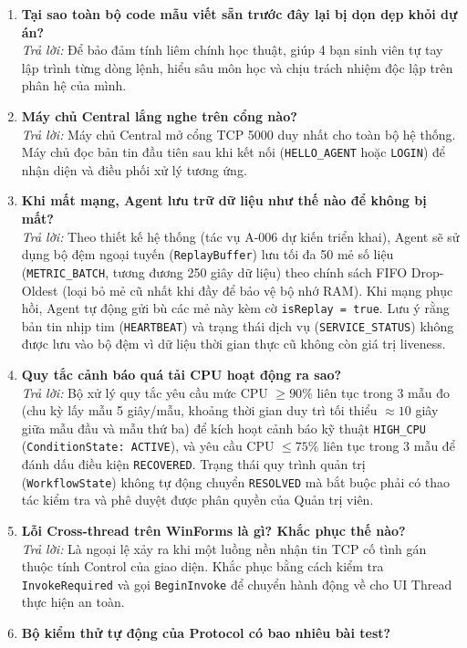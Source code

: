 \documentclass[12pt,a4paper]{article}
\begin{document}
\begin{enumerate}[leftmargin=*, label=\textbf{Câu \arabic*:}]
  \item \textbf{Tại sao toàn bộ code mẫu viết sẵn trước đây lại bị dọn dẹp khỏi dự án?} \\
    \textit{Trả lời:} Để bảo đảm tính liêm chính học thuật, giúp 4 bạn sinh viên tự tay lập trình từng dòng lệnh, hiểu sâu môn học và chịu trách nhiệm độc lập trên phân hệ của mình.
  \item \textbf{Máy chủ Central lắng nghe trên cổng nào?} \\
    \textit{Trả lời:} Máy chủ Central mở cổng TCP 5000 duy nhất cho toàn bộ hệ thống. Máy chủ đọc bản tin đầu tiên sau khi kết nối (\texttt{HELLO\_AGENT} hoặc \texttt{LOGIN}) để nhận diện và điều phối xử lý tương ứng.
  \item \textbf{Khi mất mạng, Agent lưu trữ dữ liệu như thế nào để không bị mất?} \\
    \textit{Trả lời:} Theo thiết kế hệ thống (tác vụ A-006 dự kiến triển khai), Agent sẽ sử dụng bộ đệm ngoại tuyến (\texttt{ReplayBuffer}) lưu tối đa 50 mẻ số liệu (\texttt{METRIC\_BATCH}, tương đương 250 giây dữ liệu) theo chính sách FIFO Drop-Oldest (loại bỏ mẻ cũ nhất khi đầy để bảo vệ bộ nhớ RAM). Khi mạng phục hồi, Agent tự động gửi bù các mẻ này kèm cờ \texttt{isReplay = true}. Lưu ý rằng bản tin nhịp tim (\texttt{HEARTBEAT}) và trạng thái dịch vụ (\texttt{SERVICE\_STATUS}) không được lưu vào bộ đệm vì dữ liệu thời gian thực cũ không còn giá trị liveness.
  \item \textbf{Quy tắc cảnh báo quá tải CPU hoạt động ra sao?} \\
    \textit{Trả lời:} Bộ xử lý quy tắc yêu cầu mức CPU $\ge 90\%$ liên tục trong 3 mẫu đo (chu kỳ lấy mẫu 5 giây/mẫu, khoảng thời gian duy trì tối thiểu $\approx 10$ giây giữa mẫu đầu và mẫu thứ ba) để kích hoạt cảnh báo kỹ thuật \texttt{HIGH\_CPU} (\texttt{ConditionState: ACTIVE}), và yêu cầu CPU $\le 75\%$ liên tục trong 3 mẫu để đánh dấu điều kiện \texttt{RECOVERED}. Trạng thái quy trình quản trị (\texttt{WorkflowState}) không tự động chuyển \texttt{RESOLVED} mà bắt buộc phải có thao tác kiểm tra và phê duyệt được phân quyền của Quản trị viên.
  \item \textbf{Lỗi Cross-thread trên WinForms là gì? Khắc phục thế nào?} \\
    \textit{Trả lời:} Là ngoại lệ xảy ra khi một luồng nền nhận tin TCP cố tình gán thuộc tính Control của giao diện. Khắc phục bằng cách kiểm tra \texttt{InvokeRequired} và gọi \texttt{BeginInvoke} để chuyển hành động về cho UI Thread thực hiện an toàn.
  \item \textbf{Bộ kiểm thử tự động của Protocol có bao nhiêu bài test?} \\

\end{enumerate}
\end{document}
